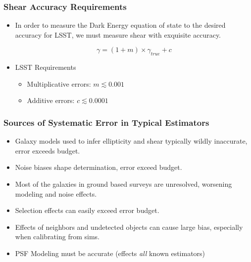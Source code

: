\documentclass{beamer}
\begin{document}
\frame
{
    \frametitle{Shear Accuracy Requirements}

 
    \begin{itemize}

        \item In order to measure the Dark Energy equation of state
            to the desired accuracy for LSST, we must measure
            shear with exquisite accuracy.

            {\color{lightskyblue}
                \begin{equation}
                    \gamma = (1 + m ) \times \gamma_{true} + c \nonumber
                \end{equation}
            } 

        \item LSST Requirements
            \begin{itemize}
                \item Multiplicative errors: {\color{gold} $m \lesssim 0.001$}
                \item Additive errors: {\color{brightred} $c \lesssim 0.0001$}
            \end{itemize}


    \end{itemize}

}


\frame
{
    \frametitle{Sources of Systematic Error in Typical Estimators}

 
    \begin{itemize}

        \item Galaxy models used to infer ellipticity and shear 
            typically wildly inaccurate, error exceeds budget.

        \item Noise biases shape determination, error exceed budget.

        \item Most of the galaxies in ground based surveys are
            unresolved, worsening modeling and noise effects.

        \item Selection effects can easily exceed error budget.

        \item Effects of neighbors and undetected objects can cause
            large bias, especially when calibrating from sims.

        \item PSF Modeling must be accurate (effects {\em all} known estimators)

    \end{itemize}

}
\end{document}
